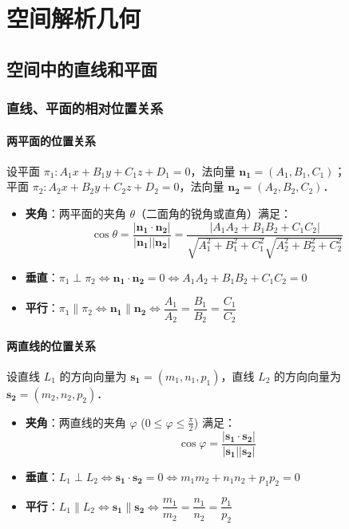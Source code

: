 \documentclass[12pt, a4paper, oneside, UTF8]{ctexbook}
\begin{document}
% 
\else
\fi

\chapter{空间解析几何}

\section{空间中的直线和平面}

\subsection{直线、平面的相对位置关系}

\subsubsection{两平面的位置关系}
设平面 $\pi_1: A_1x+B_1y+C_1z+D_1=0$，法向量 $\boldsymbol{n_1}=(A_1, B_1, C_1)$；\\
平面 $\pi_2: A_2x+B_2y+C_2z+D_2=0$，法向量 $\boldsymbol{n_2}=(A_2, B_2, C_2)$．

\begin{itemize}
    \item \textbf{夹角}：两平面的夹角 $\theta$（二面角的锐角或直角）满足：
    \[ 
        \cos\theta = \frac{|\boldsymbol{n_1} \cdot \boldsymbol{n_2}|}{|\boldsymbol{n_1}||\boldsymbol{n_2}|} = \frac{|A_1A_2+B_1B_2+C_1C_2|}{\sqrt{A_1^2+B_1^2+C_1^2}\sqrt{A_2^2+B_2^2+C_2^2}} 
    \]
    \item \textbf{垂直}：$\pi_1 \perp \pi_2 \iff \boldsymbol{n_1} \cdot \boldsymbol{n_2} = 0 \iff A_1A_2+B_1B_2+C_1C_2=0$
    \item \textbf{平行}：$\pi_1 \parallel \pi_2 \iff \boldsymbol{n_1} \parallel \boldsymbol{n_2} \iff \dfrac{A_1}{A_2}=\dfrac{B_1}{B_2}=\dfrac{C_1}{C_2}$
\end{itemize}

\subsubsection{两直线的位置关系}
设直线 $L_1$ 的方向向量为 $\boldsymbol{s_1}=(m_1, n_1, p_1)$，直线 $L_2$ 的方向向量为 $\boldsymbol{s_2}=(m_2, n_2, p_2)$．

\begin{itemize}
    \item \textbf{夹角}：两直线的夹角 $\varphi$ ($0 \le \varphi \le \frac{\pi}{2}$) 满足：
    \[ 
        \cos\varphi = \frac{|\boldsymbol{s_1} \cdot \boldsymbol{s_2}|}{|\boldsymbol{s_1}||\boldsymbol{s_2}|} 
    \]
    \item \textbf{垂直}：$L_1 \perp L_2 \iff \boldsymbol{s_1} \cdot \boldsymbol{s_2} = 0 \iff m_1m_2+n_1n_2+p_1p_2=0$
    \item \textbf{平行}：$L_1 \parallel L_2 \iff \boldsymbol{s_1} \parallel \boldsymbol{s_2} \iff \dfrac{m_1}{m_2}=\dfrac{n_1}{n_2}=\dfrac{p_1}{p_2}$
\end{itemize}
\end{document}

